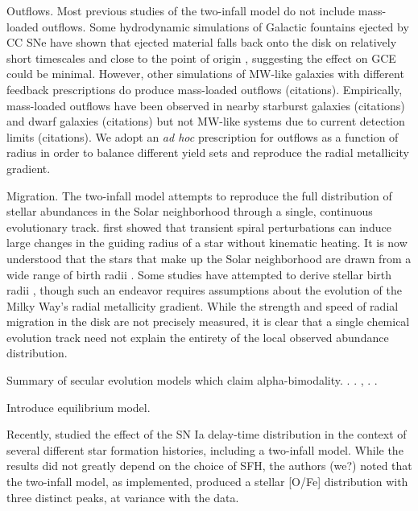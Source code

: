 \documentclass[twocolumn,twocolappendix,linenumbers]{aastex631}
\newcommand{\todo}[1]{{\color{red}#1}}
\begin{document}
\todo{Outflows.} Most previous studies of the two-infall model do not include mass-loaded outflows. Some hydrodynamic simulations of Galactic fountains ejected by CC SNe have shown that ejected material falls back onto the disk on relatively short timescales \citep{spitoni_galactic_2008,spitoni_effects_2009} and close to the point of origin \citep{melioli_hydrodynamical_2008,melioli_hydrodynamical_2009}, suggesting the effect on GCE could be minimal. However, other simulations of MW-like galaxies with different feedback prescriptions do produce mass-loaded outflows \todo{(citations)}. Empirically, mass-loaded outflows have been observed in nearby starburst galaxies \todo{(citations)} and dwarf galaxies \todo{(citations)} but not MW-like systems due to current detection limits \todo{(citations)}. We adopt an {\it ad hoc} prescription for outflows as a function of radius in order to balance different yield sets and reproduce the radial metallicity gradient.

\todo{Migration.} The two-infall model attempts to reproduce the full distribution of stellar abundances in the Solar neighborhood through a single, continuous evolutionary track. \citet{sellwood_radial_2002} first showed that transient spiral perturbations can induce large changes in the guiding radius of a star without kinematic heating. It is now understood that the stars that make up the Solar neighborhood are drawn from a wide range of birth radii \citep[e.g.,][]{schonrich_chemical_2009,frankel_measuring_2018,lehmann_probing_2024}. Some studies have attempted to derive stellar birth radii \citep[e.g.,][]{ratcliffe_unveiling_2023,lu_there_2024}, though such an endeavor requires assumptions about the evolution of the Milky Way's radial metallicity gradient. While the strength and speed of radial migration in the disk are not precisely measured, it is clear that a single chemical evolution track need not explain the entirety of the local observed abundance distribution.

\todo{Summary of secular evolution models which claim alpha-bimodality.} \citet{schonrich_chemical_2009}. \citet{kubryk_evolution_2015}. \citet{sharma_chemical_2021}, \citet{chen_chemical_2023}. \citet{prantzos_origin_2023}.

\todo{Introduce equilibrium model.}

Recently, \citet{dubay_galactic_2024} studied the effect of the SN Ia delay-time distribution in the context of several different star formation histories, including a two-infall model. While the results did not greatly depend on the choice of SFH, the authors \todo{(we?)} noted that the two-infall model, as implemented, produced a stellar [O/Fe] distribution with three distinct peaks, at variance with the data.
\end{document}
